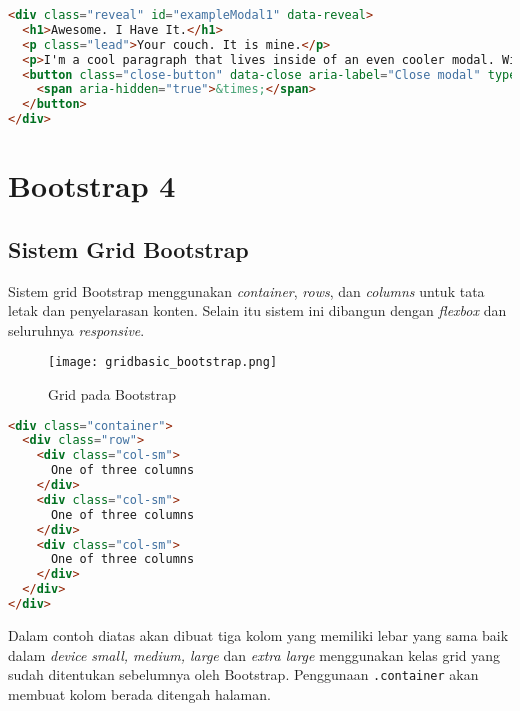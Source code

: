 \begin{itemize}
\begin{lstlisting}[language=HTML, frame=single, basicstyle=\small]  
<div class="reveal" id="exampleModal1" data-reveal>
  <h1>Awesome. I Have It.</h1>
  <p class="lead">Your couch. It is mine.</p>
  <p>I'm a cool paragraph that lives inside of an even cooler modal. Wins!</p>
  <button class="close-button" data-close aria-label="Close modal" type="button">
    <span aria-hidden="true">&times;</span>
  </button>
</div>
\end{lstlisting} 

\section{Bootstrap 4}
\subsection{Sistem Grid Bootstrap}
Sistem grid Bootstrap menggunakan \textit{container}, \textit{rows}, dan \textit{columns} untuk tata letak dan penyelarasan konten. Selain itu sistem ini dibangun dengan \textit{flexbox} dan seluruhnya \textit{responsive}. \cite{bootstrap:19}
\begin{figure} [H]
	\centering  
	\texttt{[image: gridbasic\_bootstrap.png]}  
	\caption{Grid pada Bootstrap} 
\end{figure}

\begin{lstlisting}[language=HTML, frame=single, basicstyle=\small] 
<div class="container">
  <div class="row">
    <div class="col-sm">
      One of three columns
    </div>
    <div class="col-sm">
      One of three columns
    </div>
    <div class="col-sm">
      One of three columns
    </div>
  </div>
</div>
\end{lstlisting}
Dalam contoh diatas akan dibuat tiga kolom yang memiliki lebar yang sama baik dalam \textit{device} \textit{small, medium, large} dan \textit{extra large} menggunakan kelas grid yang sudah ditentukan sebelumnya oleh Bootstrap. Penggunaan \verb|.container| akan membuat kolom berada ditengah halaman.


\end{itemize}
